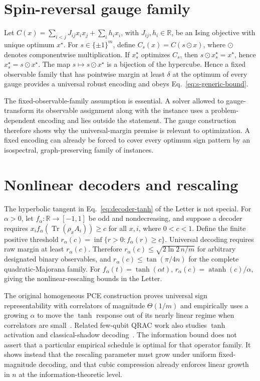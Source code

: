\documentclass[10pt,aps,pra,twocolumn,superscriptaddress,nofootinbib,longbibliography]{revtex4-2}
\newcommand{\Tr}{\operatorname{Tr}}
\newcommand{\atanh}{\operatorname{atanh}}
\newcommand{\R}{\mathbb{R}}
\begin{document}
{\section{Spin-reversal gauge family}
\label{supp:gauge}
Let $C(x)=\sum_{i<j}J_{ij}x_ix_j+\sum_i h_i x_i$, with $J_{ij},h_i\in\R$, be an Ising objective with unique optimum $x^\star$.  For $s\in\{\pm1\}^m$, define $C_s(x)=C(s\odot x)$, where $\odot$ denotes componentwise multiplication.  If $x_s^\star$ optimizes $C_s$, then $s\odot x_s^\star=x^\star$, hence $x_s^\star=s\odot x^\star$.  The map $s\mapsto s\odot x^\star$ is a bijection of the hypercube.  Hence a fixed observable family that has pointwise margin at least $\delta$ at the optimum of every gauge provides a universal robust encoding and obeys Eq.~\eqref{eq:s-generic-bound}.

The fixed-observable-family assumption is essential.  A solver allowed to gauge-transform its observable assignment along with the instance uses a problem-dependent encoding and lies outside the statement.  The gauge construction therefore shows why the universal-margin premise is relevant to optimization.  A fixed encoding can already be forced to cover every optimum sign pattern by an isospectral, graph-preserving family of instances.

\section{Nonlinear decoders and rescaling}
\label{supp:rescaling}
The hyperbolic tangent in Eq.~\eqref{eq:decoder-tanh} of the Letter is not special.  For $\alpha>0$, let $f_\alpha:\R\to[-1,1]$ be odd and nondecreasing, and suppose a decoder requires $x_i f_\alpha(\Tr(\rho_xA_i))\ge c$ for all $x,i$, where $0<c<1$.  Define the finite positive threshold $r_\alpha(c)=\inf\{r>0:f_\alpha(r)\ge c\}$.  Universal decoding requires raw margin at least $r_\alpha(c)$.  Therefore $r_\alpha(c)\le\sqrt{2\ln2\,n/m}$ for arbitrary designated binary observables, and $r_\alpha(c)\le\tan(\pi/4n)$ for the complete quadratic-Majorana family.  For $f_\alpha(t)=\tanh(\alpha t)$, $r_\alpha(c)=\atanh(c)/\alpha$, giving the nonlinear-rescaling bounds in the Letter.

The original homogeneous PCE construction proves universal sign representability with correlators of magnitude $\Theta(1/m)$ and empirically uses a growing $\alpha$ to move the $\tanh$ response out of its nearly linear regime when correlators are small~\cite{Sciorilli2025PCE}.  Related few-qubit QRAC work also studies $\tanh$ activation and classical-shadow decoding~\cite{RaymondButsPistoia2025FewQubits}.  The information bound does not assert that a particular empirical schedule is optimal for that operator family.  It shows instead that the rescaling parameter must grow under uniform fixed-magnitude decoding, and that cubic compression already enforces linear growth in $n$ at the information-theoretic level.

}
\end{document}
